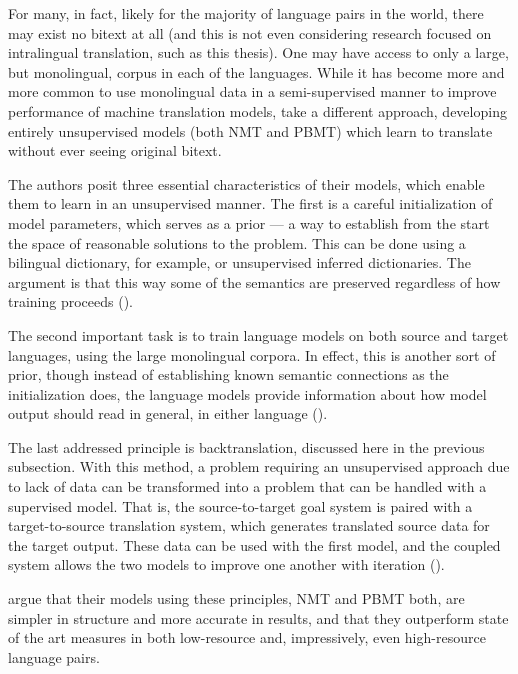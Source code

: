 For many, in fact, likely for the majority of language pairs in the world, there may exist no bitext at all (and this is not even considering research focused on intralingual translation, such as this thesis). One may have access to only a large, but monolingual, corpus in each of the languages. While it has become more and more common to use monolingual data in a semi-supervised manner to improve performance of machine translation models, \cite{lample2018unsupervised} take a different approach, developing entirely unsupervised models (both NMT and PBMT) which learn to translate without ever seeing original bitext.

The authors posit three essential characteristics of their models, which enable them to learn in an unsupervised manner. The first is a careful initialization of model parameters, which serves as a prior --- a way to establish from the start the space of reasonable solutions to the problem. This can be done using a bilingual dictionary, for example, or unsupervised inferred dictionaries. The argument is that this way some of the semantics are preserved regardless of how training proceeds (\cite{lample2018unsupervised}).

The second important task is to train language models on both source and target languages, using the large monolingual corpora. In effect, this is another sort of prior, though instead of establishing known semantic connections as the initialization does, the language models provide information about how model output should read in general, in either language (\cite{lample2018unsupervised}).

The last addressed principle is backtranslation, discussed here in the previous subsection. With this method, a problem requiring an unsupervised approach due to lack of data can be transformed into a problem that can be handled with a supervised model. That is, the source-to-target goal system is paired with a target-to-source translation system, which generates translated source data for the target output. These data can be used with the first model, and the coupled system allows the two models to improve one another with iteration (\cite{lample2018unsupervised}).

\cite{lample2018unsupervised} argue that their models using these principles, NMT and PBMT both, are simpler in structure and more accurate in results, and that they outperform state of the art measures in both low-resource and, impressively, even high-resource language pairs.


